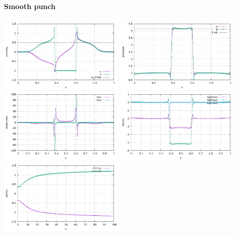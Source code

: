 \newpage
\paragraph{Smooth punch}

\begin{center}
\includegraphics[width=6cm]{python_codes/fieldstone_08/results/smooth/velocity.pdf}
\includegraphics[width=6cm]{python_codes/fieldstone_08/results/smooth/pressure.pdf}\\
\includegraphics[width=6cm]{python_codes/fieldstone_08/results/smooth/strainrate.pdf}
\includegraphics[width=6cm]{python_codes/fieldstone_08/results/smooth/stress.pdf}\\
\includegraphics[width=6cm]{python_codes/fieldstone_08/results/smooth/u_stats.pdf}

\end{center}
